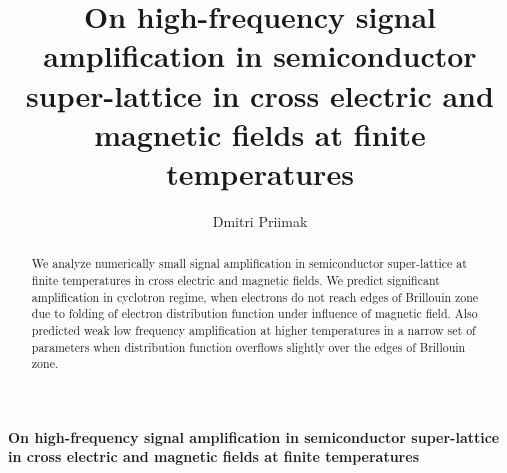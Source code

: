 \documentclass[40pt,letterpaper,physrev]{article}
\author{Dmitri Priimak}
\title{On high-frequency signal amplification in semiconductor super-lattice in cross electric and magnetic fields 
at finite temperatures}
\begin{document}

\newcommand{\ddx}[2] {
	\frac{\text{d}#1}{\text{d}#2}
}
\newcommand{\ddt}[1] {
	\frac{\text{d}#1}{\text{d}t}
}
\newcommand{\dtwodt}[1] {
	\frac{\text{d}^{2}#1}{\text{d}t^{2}}
}
 \begin{center}
  {\bf On high-frequency signal amplification in semiconductor super-lattice in cross electric and magnetic fields 
at finite temperatures}
 \end{center}
  \begin{abstract}
  We analyze numerically small signal amplification in semiconductor super-lattice at finite temperatures in cross
electric and magnetic fields. We predict significant amplification in cyclotron regime, when electrons do not reach
edges of Brillouin zone due to folding of electron distribution function under influence of magnetic field. Also
predicted weak low frequency amplification at higher temperatures in a narrow set of parameters when distribution
function overflows slightly over the edges of Brillouin zone.
  \end{abstract}
\end{document}
